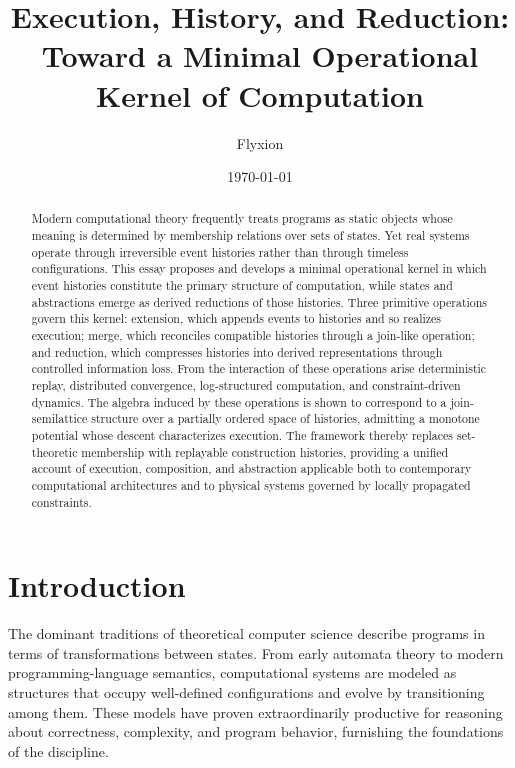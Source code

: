 \documentclass[12pt]{article}
\title{Execution, History, and Reduction:\\
Toward a Minimal Operational Kernel of Computation}
\author{Flyxion}
\date{\today}
\begin{document}
\maketitle

\begin{abstract}
Modern computational theory frequently treats programs as static objects whose meaning is determined by membership relations over sets of states. Yet real systems operate through irreversible event histories rather than through timeless configurations. This essay proposes and develops a minimal operational kernel in which event histories constitute the primary structure of computation, while states and abstractions emerge as derived reductions of those histories. Three primitive operations govern this kernel: extension, which appends events to histories and so realizes execution; merge, which reconciles compatible histories through a join-like operation; and reduction, which compresses histories into derived representations through controlled information loss. From the interaction of these operations arise deterministic replay, distributed convergence, log-structured computation, and constraint-driven dynamics. The algebra induced by these operations is shown to correspond to a join-semilattice structure over a partially ordered space of histories, admitting a monotone potential whose descent characterizes execution. The framework thereby replaces set-theoretic membership with replayable construction histories, providing a unified account of execution, composition, and abstraction applicable both to contemporary computational architectures and to physical systems governed by locally propagated constraints.
\end{abstract}

\tableofcontents

\newpage


\section*{Introduction}

The dominant traditions of theoretical computer science describe programs in terms of transformations between states. From early automata theory to modern programming-language semantics, computational systems are modeled as structures that occupy well-defined configurations and evolve by transitioning among them. These models have proven extraordinarily productive for reasoning about correctness, complexity, and program behavior, furnishing the foundations of the discipline.
\end{document}
